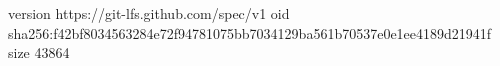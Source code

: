 version https://git-lfs.github.com/spec/v1
oid sha256:f42bf8034563284e72f94781075bb7034129ba561b70537e0e1ee4189d21941f
size 43864
